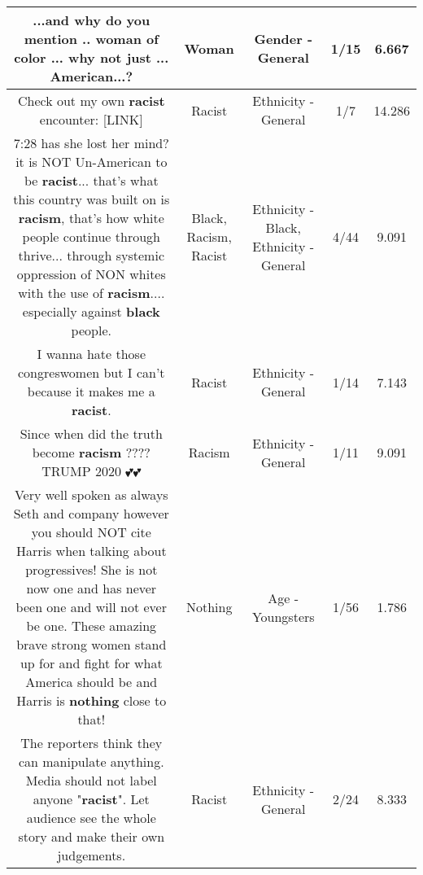 \documentclass[11pt]{article}
\newlength\mylength
\begin{document}
\begin{center}
\begin{longtable}{|C{.65\mylength}|C{.30\mylength}|C{.12\mylength}|C{.12\mylength}|C{.12\mylength}|}
  \small ...and why do you mention .. \textbf{woman} of color ... why not just ... American...?\normalsize   & Woman & Gender - General & 1/15 & 6.667 \\  \hline
  \small Check out my own \textbf{racist} encounter: [LINK] \normalsize   & Racist & Ethnicity - General & 1/7 & 14.286 \\  \hline
  \small 7:28 has she lost her mind? it is NOT Un-American to be \textbf{racist}... that's what this country was built on is \textbf{racism}, that's how white people continue through thrive...  through systemic oppression of NON whites with the use of \textbf{racism}.... especially against \textbf{black} people.\normalsize   & Black, Racism, Racist & Ethnicity - Black, Ethnicity - General & 4/44 & 9.091 \\  \hline
  \small I wanna hate those congreswomen but I can't because it makes me a \textbf{racist}.\normalsize   & Racist & Ethnicity - General & 1/14 & 7.143 \\  \hline
  \small Since when did the truth become \textbf{racism} ????TRUMP 2020 💕💕\normalsize   & Racism & Ethnicity - General & 1/11 & 9.091 \\  \hline
  \small Very well spoken as always Seth and company however you should NOT cite Harris when talking about progressives! She is not now one and has never been one and will not ever be one. These amazing brave strong women stand up for and fight for what America should be and Harris is \textbf{nothing} close to that!\normalsize   & Nothing & Age - Youngsters & 1/56 & 1.786 \\  \hline
  \small The reporters think they can manipulate anything. Media should not label anyone "\textbf{racist}". Let audience see the whole story and make their own judgements.\normalsize   & Racist & Ethnicity - General & 2/24 & 8.333 \\  \hline

\end{longtable}
\end{center}
\end{document}
